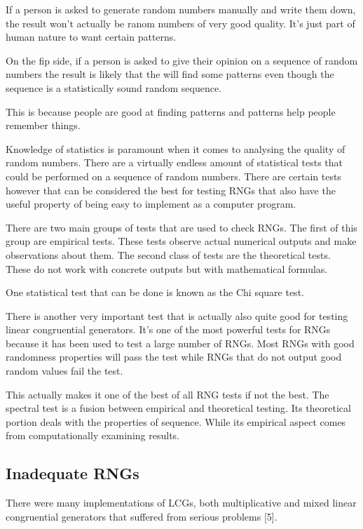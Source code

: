 \documentclass{article}
\begin{document}
    If a person is asked to generate random numbers manually and write them down,
    the result won't actually be ranom numbers of very good quality.
    It's just part of human nature to want certain patterns.

    On the fip side, if a person is asked to give their opinion on
    a sequence of random numbers the result is likely that the will find some patterns
    even though the sequence is a statistically sound random sequence.

    This is because people are good at finding patterns and patterns help people remember
    things.

    Knowledge of statistics is paramount when it comes to analysing the quality
    of random numbers. There are a virtually endless amount of statistical tests
    that could be performed on a sequence of random numbers.
    There are certain tests however that can be considered the best for testing RNGs
    that also have the useful property of being easy to implement as a computer program.

    There are two main groups of tests that are used to check RNGs.
    The first of this group are empirical tests. These tests observe
    actual numerical outputs and make observations about them.
    The second class of tests are the theoretical tests.
    These do not work with concrete outputs but with mathematical formulas.

    One statistical test that can be done is known as the Chi square test.

    There is another very important test that is actually also quite good
    for testing linear congruential generators. It's one of the most powerful
    tests for RNGs because it has been used to test a large number of
    RNGs. Most RNGs with good randomness properties will pass the test while
    RNGs that do not output good random values fail the test.

    This actually makes it one of the best of all RNG tests if not the best.
    The spectral test is a fusion between empirical and theoretical testing.
    Its theoretical portion deals with the properties of sequence.
    While its empirical aspect comes from computationally examining results.

    \subsection{Inadequate RNGs}

    There were many implementations of LCGs, both multiplicative and
    mixed linear congruential generators that suffered from serious problems [5].
\end{document}
